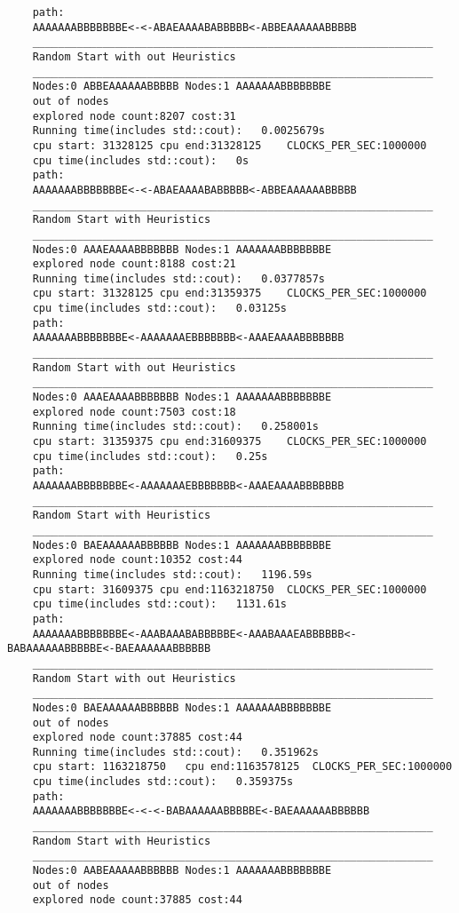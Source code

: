 \documentclass[12pt]{article}
\begin{document}
\begin{lstlisting}
	path:
	AAAAAAABBBBBBBE<-<-ABAEAAAABABBBBB<-ABBEAAAAAABBBBB
	_______________________________________________________________
	Random Start with out Heuristics
	_______________________________________________________________
	Nodes:0	ABBEAAAAAABBBBB Nodes:1	AAAAAAABBBBBBBE
	out of nodes
	explored node count:8207 cost:31
	Running time(includes std::cout):	0.0025679s
	cpu start: 31328125	cpu end:31328125	CLOCKS_PER_SEC:1000000
	cpu time(includes std::cout):	0s
	path:
	AAAAAAABBBBBBBE<-<-ABAEAAAABABBBBB<-ABBEAAAAAABBBBB
	_______________________________________________________________
	Random Start with Heuristics
	_______________________________________________________________
	Nodes:0	AAAEAAAABBBBBBB Nodes:1	AAAAAAABBBBBBBE
	explored node count:8188 cost:21
	Running time(includes std::cout):	0.0377857s
	cpu start: 31328125	cpu end:31359375	CLOCKS_PER_SEC:1000000
	cpu time(includes std::cout):	0.03125s
	path:
	AAAAAAABBBBBBBE<-AAAAAAAEBBBBBBB<-AAAEAAAABBBBBBB
	_______________________________________________________________
	Random Start with out Heuristics
	_______________________________________________________________
	Nodes:0	AAAEAAAABBBBBBB Nodes:1	AAAAAAABBBBBBBE
	explored node count:7503 cost:18
	Running time(includes std::cout):	0.258001s
	cpu start: 31359375	cpu end:31609375	CLOCKS_PER_SEC:1000000
	cpu time(includes std::cout):	0.25s
	path:
	AAAAAAABBBBBBBE<-AAAAAAAEBBBBBBB<-AAAEAAAABBBBBBB
	_______________________________________________________________
	Random Start with Heuristics
	_______________________________________________________________
	Nodes:0	BAEAAAAAABBBBBB Nodes:1	AAAAAAABBBBBBBE
	explored node count:10352 cost:44
	Running time(includes std::cout):	1196.59s
	cpu start: 31609375	cpu end:1163218750	CLOCKS_PER_SEC:1000000
	cpu time(includes std::cout):	1131.61s
	path:
	AAAAAAABBBBBBBE<-AAABAAABABBBBBE<-AAABAAAEABBBBBB<-BABAAAAAABBBBBE<-BAEAAAAAABBBBBB
	_______________________________________________________________
	Random Start with out Heuristics
	_______________________________________________________________
	Nodes:0	BAEAAAAAABBBBBB Nodes:1	AAAAAAABBBBBBBE
	out of nodes
	explored node count:37885 cost:44
	Running time(includes std::cout):	0.351962s
	cpu start: 1163218750	cpu end:1163578125	CLOCKS_PER_SEC:1000000
	cpu time(includes std::cout):	0.359375s
	path:
	AAAAAAABBBBBBBE<-<-<-BABAAAAAABBBBBE<-BAEAAAAAABBBBBB
	_______________________________________________________________
	Random Start with Heuristics
	_______________________________________________________________
	Nodes:0	AABEAAAAABBBBBB Nodes:1	AAAAAAABBBBBBBE
	out of nodes
	explored node count:37885 cost:44

\end{lstlisting}
\end{document}
